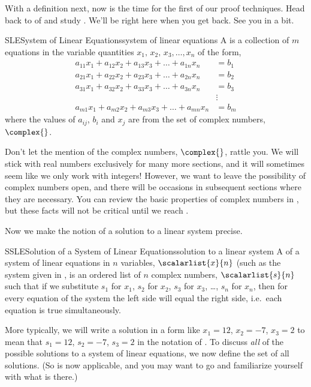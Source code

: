 %
{With a definition next, now is the time for the first of our proof techniques.}
{Head back to  of  and study .  We'll be right here when you get back.  See you in a bit.}
%
\begin{definition}{SLE}{System of Linear Equations}{system of linear equations}
A  is a collection of $m$ equations in the variable quantities $x_1,\,x_2,\,x_3,\ldots,x_n$ of the form,
\begin{align*}
a_{11}x_1+a_{12}x_2+a_{13}x_3+\dots+a_{1n}x_n&=b_1\\
a_{21}x_1+a_{22}x_2+a_{23}x_3+\dots+a_{2n}x_n&=b_2\\
a_{31}x_1+a_{32}x_2+a_{33}x_3+\dots+a_{3n}x_n&=b_3\\
&\vdots\\
a_{m1}x_1+a_{m2}x_2+a_{m3}x_3+\dots+a_{mn}x_n&=b_m
\end{align*}
where the values of $a_{ij}$, $b_i$ and $x_j$ are from the set of complex numbers, $\complex{\null}$.
\end{definition}
%
Don't let the mention of the complex numbers, $\complex{\null}$, rattle you.  We will stick with real numbers exclusively for many more sections, and it will sometimes seem like we only work with integers!  However, we want to leave the possibility of complex numbers open, and there will be occasions in subsequent sections where they are necessary.  You can review the basic properties of complex numbers in , but these facts will not be critical until we reach .\par
%
Now we make the notion of a solution to a linear system precise.
%
\begin{definition}{SSLE}{Solution of a System of Linear Equations}{solution to a linear system}
A  of a system of linear equations in $n$ variables, $\scalarlist{x}{n}$ (such as the system given in , is an ordered list of $n$ complex numbers, $\scalarlist{s}{n}$ such that if we substitute $s_1$ for $x_1$, $s_2$ for $x_2$, $s_3$ for $x_3$, \dots, $s_n$ for $x_n$,  then for every equation of the system the left side will equal the right side, i.e.\ each equation is true simultaneously.
\end{definition}
%
More typically, we will write a solution in a form like $x_1=12$, $x_2=-7$, $x_3=2$ to mean that $s_1=12$, $s_2=-7$, $s_3=2$ in the notation of .  To discuss {\em all} of the possible solutions to a system of linear equations, we now define the set of all solutions.  (So  is now applicable, and you may want to go and familiarize yourself with what is there.)
